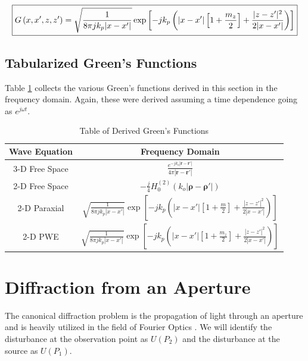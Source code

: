 \begin{equation}
\boxed{G\left(x,x',z,z' \right)= \sqrt{\frac{1}{8\pi jk_p|x-x'|}}\exp\left[-jk_p\left(|x-x'|\left[1+\frac{m_z}{2}\right] + \frac{|z-z'|^2}{2|x-x'|}\right) \right]}\\
\label{gf_eq:202}
\end{equation}
 \renewcommand{\baselinestretch}{2} \small\normalsize

\subsection {Tabularized Green's Functions}
Table \ref{gf_tab:0} collects the various Green's functions derived in this section in the frequency domain. Again, these were derived assuming a time dependence going as $e^{j\omega t}$.

\begin{table}[ht]
  \centering
  \begin{quote}
    \caption[Table of Derived Green's Functions]{Table of Derived Green's Functions\label{gf_tab:0}}
  \end{quote}
  \setlength\extrarowheight{2.5pt}
  \begin{tabular} {|c | c |}
    \hline
  \bf{Wave Equation} & \bf{Frequency Domain} \\ \hline
  3-D Free Space & $\displaystyle\frac{e^{-jk_o|\mathbf{r} - \mathbf{r}'|}}{4\pi |\mathbf{r} - \mathbf{r}'|}$ \\[7.5pt] \hline
  2-D Free Space & $\displaystyle -\frac{j}{4}H_0^{(2)}\left(k_o|\boldsymbol{\rho} - \boldsymbol{\rho}' | \right)$ \\[7.5pt]  \hline
  2-D Paraxial & $\displaystyle\sqrt{\frac{1}{8\pi jk_p|x-x'|}}\exp\left[-jk_p\left(|x-x'|\left[1+\frac{m}{2}\right] + \frac{|z-z'|^2}{2|x-x'|}\right)\right]$\\[7.5pt] \hline
  2-D PWE &$\displaystyle\sqrt{\frac{1}{8\pi jk_p|x-x'|}}\exp\left[-jk_p\left(|x-x'|\left[1+\frac{m_z}{2}\right] + \frac{|z-z'|^2}{2|x-x'|}\right) \right]$ \\[7.5pt] \hline
\end{tabular}

\end{table}
\renewcommand{\baselinestretch}{2} \small\normalsize

\section {Diffraction from an Aperture}
The canonical diffraction problem is the propagation of light through an aperture and is heavily utilized in the field of Fourier Optics \cite{goodman_fourier} \cite{gaskill_fourier}. We will identify the disturbance at the observation point as $U(P_2)$ and the disturbance at the source as $U(P_1)$.

